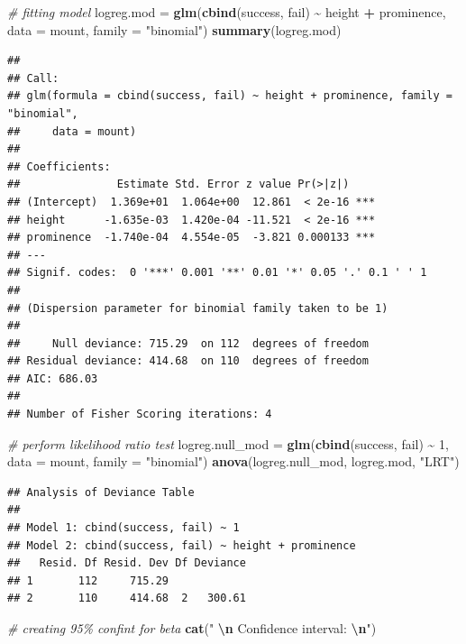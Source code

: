 \documentclass[
]{article}
\newenvironment{Shaded}{\begin{snugshade}}{\end{snugshade}}
\newcommand{\AttributeTok}[1]{\textcolor[rgb]{0.13,0.29,0.53}{#1}}
\newcommand{\CommentTok}[1]{\textcolor[rgb]{0.56,0.35,0.01}{\textit{#1}}}
\newcommand{\DecValTok}[1]{\textcolor[rgb]{0.00,0.00,0.81}{#1}}
\newcommand{\FunctionTok}[1]{\textcolor[rgb]{0.13,0.29,0.53}{\textbf{#1}}}
\newcommand{\NormalTok}[1]{#1}
\newcommand{\OtherTok}[1]{\textcolor[rgb]{0.56,0.35,0.01}{#1}}
\newcommand{\SpecialCharTok}[1]{\textcolor[rgb]{0.81,0.36,0.00}{\textbf{#1}}}
\newcommand{\StringTok}[1]{\textcolor[rgb]{0.31,0.60,0.02}{#1}}
\begin{document}
\begin{Shaded}
\begin{Highlighting}[]
\CommentTok{\# fitting model}
\NormalTok{logreg.mod }\OtherTok{=} \FunctionTok{glm}\NormalTok{(}\FunctionTok{cbind}\NormalTok{(success, fail) }\SpecialCharTok{\textasciitilde{}}\NormalTok{ height }\SpecialCharTok{+}\NormalTok{ prominence, }\AttributeTok{data =}\NormalTok{ mount,}
    \AttributeTok{family =} \StringTok{"binomial"}\NormalTok{)}
\FunctionTok{summary}\NormalTok{(logreg.mod)}
\end{Highlighting}
\end{Shaded}

\begin{verbatim}
## 
## Call:
## glm(formula = cbind(success, fail) ~ height + prominence, family = "binomial", 
##     data = mount)
## 
## Coefficients:
##               Estimate Std. Error z value Pr(>|z|)    
## (Intercept)  1.369e+01  1.064e+00  12.861  < 2e-16 ***
## height      -1.635e-03  1.420e-04 -11.521  < 2e-16 ***
## prominence  -1.740e-04  4.554e-05  -3.821 0.000133 ***
## ---
## Signif. codes:  0 '***' 0.001 '**' 0.01 '*' 0.05 '.' 0.1 ' ' 1
## 
## (Dispersion parameter for binomial family taken to be 1)
## 
##     Null deviance: 715.29  on 112  degrees of freedom
## Residual deviance: 414.68  on 110  degrees of freedom
## AIC: 686.03
## 
## Number of Fisher Scoring iterations: 4
\end{verbatim}

\begin{Shaded}
\begin{Highlighting}[]
\CommentTok{\# perform likelihood ratio test}
\NormalTok{logreg.null\_mod }\OtherTok{=} \FunctionTok{glm}\NormalTok{(}\FunctionTok{cbind}\NormalTok{(success, fail) }\SpecialCharTok{\textasciitilde{}} \DecValTok{1}\NormalTok{, }\AttributeTok{data =}\NormalTok{ mount, }\AttributeTok{family =} \StringTok{"binomial"}\NormalTok{)}
\FunctionTok{anova}\NormalTok{(logreg.null\_mod, logreg.mod, }\StringTok{"LRT"}\NormalTok{)}
\end{Highlighting}
\end{Shaded}

\begin{verbatim}
## Analysis of Deviance Table
## 
## Model 1: cbind(success, fail) ~ 1
## Model 2: cbind(success, fail) ~ height + prominence
##   Resid. Df Resid. Dev Df Deviance
## 1       112     715.29            
## 2       110     414.68  2   300.61
\end{verbatim}

\begin{Shaded}
\begin{Highlighting}[]
\CommentTok{\# creating 95\% confint for beta}
\FunctionTok{cat}\NormalTok{(}\StringTok{" }\SpecialCharTok{\textbackslash{}n}\StringTok{ Confidence interval: }\SpecialCharTok{\textbackslash{}n}\StringTok{"}\NormalTok{)}
\end{Highlighting}
\end{Shaded}
\end{document}
